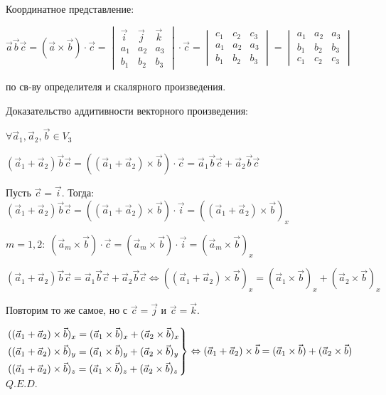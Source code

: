 \documentclass[twoside]{book}
\begin{document}
Координатное представление:

\(\vec a \vec b \vec c = (\vec a \times \vec b) \cdot \vec c =
\begin{vmatrix}
    \vec i & \vec j & \vec k \\
    a_1    & a_2    & a_3    \\
    b_1    & b_2    & b_3
\end{vmatrix} \cdot \vec c =
\begin{vmatrix}
    c_1 & c_2 & c_3 \\
    a_1 & a_2 & a_3 \\
    b_1 & b_2 & b_3
\end{vmatrix} =
\begin{vmatrix}
    a_1 & a_2 & a_3 \\
    b_1 & b_2 & b_3 \\
    c_1 & c_2 & c_3
\end{vmatrix}\)

по св-ву определителя и скалярного произведения.

Доказательство аддитивности векторного произведения:

\(\forall \vec a_1, \vec a_2, \vec b \in V_3\)

\((\vec a_1 + \vec a_2)\vec b \vec c = ((\vec a_1 + \vec a_2) \times \vec b) \cdot \vec c = \vec a_1 \vec b \vec c + \vec a_2 \vec b \vec c\)

Пусть \(\vec c = \vec i\). Тогда: \((\vec a_1 + \vec a_2)\vec b \vec c = ((\vec a_1 + \vec a_2) \times \vec b) \cdot \vec i = ((\vec a_1 + \vec a_2) \times \vec b)_x\)

\(m = 1, 2:\; (\vec a_m \times \vec b) \cdot \vec c = (\vec a_m \times \vec b) \cdot \vec i = (\vec a_m \times \vec b)_x\)

\((\vec a_1 + \vec a_2)\vec b \vec c = \vec a_1 \vec b \vec c + \vec a_2 \vec b \vec c \Leftrightarrow ((\vec a_1 + \vec a_2) \times \vec b)_x = (\vec a_1 \times \vec b)_x + (\vec a_2 \times \vec b)_x\)

Повторим то же самое, но с \(\vec c = \vec j\) и \(\vec c = \vec k\).

\(\begin{rcases}
    ((\vec a_1 + \vec a_2) \times \vec b)_x = (\vec a_1 \times \vec b)_x + (\vec a_2 \times \vec b)_x \\
    ((\vec a_1 + \vec a_2) \times \vec b)_y = (\vec a_1 \times \vec b)_y + (\vec a_2 \times \vec b)_y \\
    ((\vec a_1 + \vec a_2) \times \vec b)_z = (\vec a_1 \times \vec b)_z + (\vec a_2 \times \vec b)_z
\end{rcases} \Leftrightarrow (\vec a_1 + \vec a_2) \times \vec b = (\vec a_1 \times \vec b) + (\vec a_2 \times \vec b)\) \(Q.E.D.\)
\end{document}
